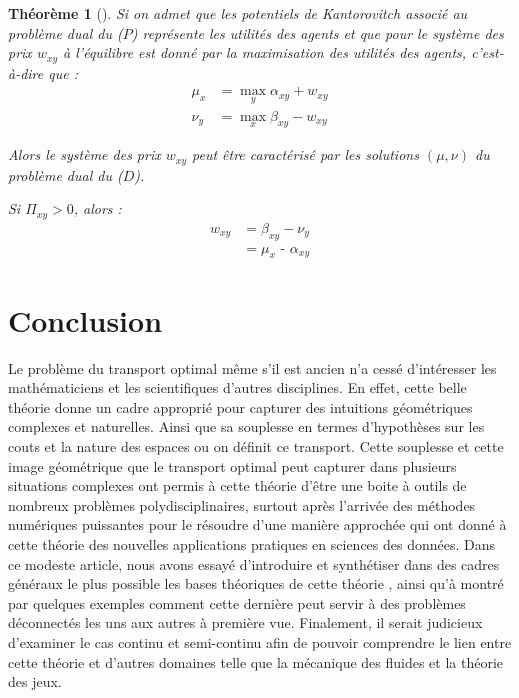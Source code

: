 \documentclass[
    8.2pt,
    a4paper,
    logo,
    twocolumn
]{template}
\newtheorem{theorem}{Théorème}
\begin{document}
    \textbf{
    }

    \begin{theorem}[\citep{galichon_optimal_2016}]
        Si on admet que les potentiels de Kantorovitch associé au problème dual du ($P$) représente les utilités des agents et que pour le système des prix $w_{xy}$ à l’équilibre est donné par la maximisation des utilités des agents, c’est-à-dire que :
        \begin{align*}
            \mu_x &= \max_{y} \alpha_{xy} + w_{xy} \\
            \nu_y &= \max_{x} \beta_{xy} - w_{xy}
        \end{align*}

        Alors le système des prix $w_{xy}$ peut être caractérisé par les solutions $(\mu,\nu)$ du problème dual du ($D$).

        Si $\Pi_{xy} > 0$, alors :
        \begin{align*}
            w_{xy} &= \beta_{xy} - \nu_y \\
                   &= \mu_{x} \text{ - } \alpha_{xy}
        \end{align*}
    \end{theorem}

    \section{Conclusion}\label{sec:conclusion}
    Le problème du transport optimal même s’il est ancien n’a cessé d’intéresser les mathématiciens et les scientifiques d’autres disciplines. En effet, cette belle théorie donne un cadre approprié pour capturer des intuitions géométriques complexes et naturelles. Ainsi que sa souplesse en termes d’hypothèses sur les couts et la nature des espaces ou on définit ce transport. Cette souplesse et cette image géométrique que le transport optimal peut capturer dans plusieurs situations complexes ont permis à cette théorie d’être une boite à outils de nombreux problèmes polydisciplinaires, surtout après l’arrivée des méthodes numériques puissantes pour le résoudre d’une manière approchée qui ont donné à cette théorie des nouvelles applications pratiques en sciences des données. Dans ce modeste article, nous avons essayé d’introduire et synthétiser dans des cadres généraux le plus possible les bases théoriques de cette théorie , ainsi qu’à montré par quelques exemples comment cette dernière peut servir à des problèmes déconnectés les uns aux autres à première vue. Finalement, il serait judicieux d’examiner le cas continu et semi-continu afin de pouvoir comprendre le lien entre cette théorie et d'autres domaines telle que la mécanique des fluides et la théorie des jeux.
\end{document}
